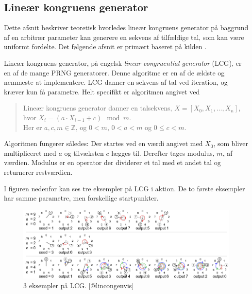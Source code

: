 \documentclass[
]{book}
\theoremstyle{definition}
\theoremstyle{definition}
\theoremstyle{definition}
\theoremstyle{remark}
\let\BeginKnitrBlock\begin \let\EndKnitrBlock\end
\begin{document}
\hypertarget{lineuxe6r-kongruens-generator}{%
\subsection{Lineær kongruens generator}\label{lineuxe6r-kongruens-generator}}

Dette afsnit beskriver teoretisk hvorledes lineær kongruens generator på baggrund af en arbitrær parameter kan generere en sekvens af tilfældige tal, som kan være uniformt fordelte. Det følgende afsnit er primært baseret på kilden \citep{LCGinfo}.

Lineær kongruens generator, på engelsk \emph{linear congruential generator} (LCG), er en af de mange PRNG generatorer. Denne algoritme er en af de ældste og nemmeste at implementere. LCG danner en sekvens af tal ved iteration, og kræver kun få parametre. Helt specifikt er algoritmen angivet ved

\begin{quote}
\BeginKnitrBlock{definition}
\protect\hypertarget{def:unnamed-chunk-2}{}{\label{def:unnamed-chunk-2} } Lineær kongruens generator danner en talsekvens, \(X = [X_0, X_1, \ldots, X_n]\), hvor \(X_{i} = (a \cdot X_{i-1} + c) \mod m\).\\
Her er \(a, c, m \in \mathbb{Z}\), og \(0 < m\), \(0 < a < m\) og \(0 \leq c < m\).
\EndKnitrBlock{definition}
\end{quote}

Algoritmen fungerer således:
Der startes ved en værdi angivet med \(X_0\), som bliver multipliceret med \(a\) og tilvæksten \(c\) lægges til. Derefter tages modulus, \(m\), af værdien. Modulus er en operator der dividerer et tal med et andet tal og returnerer restværdien.

I figuren nedenfor kan ses tre eksempler på LCG i aktion. De to første eksempler har samme parametre, men forskellige startpunkter.

\begin{figure}

{\centering \includegraphics[width=0.75\linewidth]{images/LCG_eksempel}

}

\caption{ 3 eksempler på LCG. [@lincongenvis]}\label{fig:unnamed-chunk-3}
\end{figure}
\end{document}

